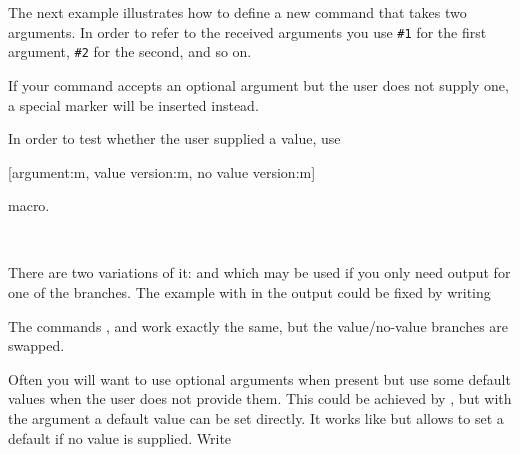 The next example illustrates how to define a new
command that takes two arguments. In order to refer to the received arguments
you use \verb|#1| for the first argument, \verb|#2| for the second, and so on.


If your command accepts an optional argument but the user does not supply one,
a special marker  will be inserted instead.
In order to test whether the user supplied a value, use
\begin{lscommand}
  [argument:m, value version:m, no value version:m]
\end{lscommand}
macro.
\begin{example}

\MyCommand\\
\MyCommand[hello]
\end{example}

There are two variations of it:  and  which may
be used if you only need output for one of the branches. The example with
 in the output could be fixed by writing
The commands ,  and 
work exactly the same, but the value\slash{}no-value branches are swapped.

Often you will want to use optional arguments when present but use some default
values when the user does not provide them. This could be achieved by
, but with the  argument a default value can be set directly.
It works like  but allows to set a default
if no value is supplied. Write

